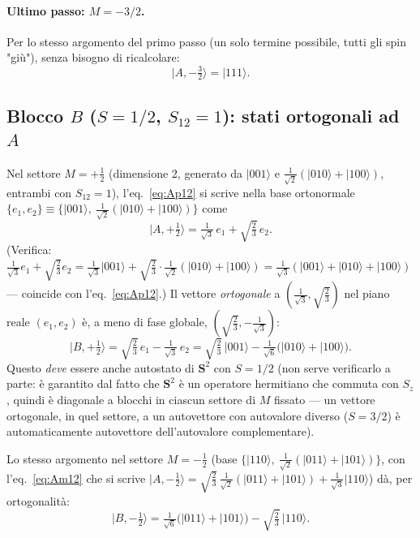 \documentclass[11pt,a4paper]{article}
\newcommand{\ket}[1]{\lvert #1\rangle}
\begin{document}
\paragraph{Ultimo passo: $M{=}{-}3/2$.} Per lo stesso argomento del primo
passo (un solo termine possibile, tutti gli spin "giù"), senza bisogno di
ricalcolare:
\begin{equation}
\ket{A,{-}\tfrac32} = \ket{111}.
\end{equation}

\subsection{Blocco $B$ ($S=1/2$, $S_{12}=1$): stati ortogonali ad $A$}

Nel settore $M=+\tfrac12$ (dimensione 2, generato da $\ket{001}$ e
$\tfrac{1}{\sqrt2}(\ket{010}+\ket{100})$, entrambi con $S_{12}=1$), l'eq.~\eqref{eq:Ap12}
si scrive nella base ortonormale $\{e_1,e_2\}\equiv\{\ket{001},\ \tfrac1{\sqrt2}(\ket{010}{+}\ket{100})\}$
come
\begin{equation}
\ket{A,{+}\tfrac12} = \tfrac{1}{\sqrt3}\,e_1 + \sqrt{\tfrac23}\,e_2 .
\end{equation}
(Verifica: $\tfrac1{\sqrt3}e_1+\sqrt{\tfrac23}e_2 = \tfrac1{\sqrt3}\ket{001}+\sqrt{\tfrac23}\cdot\tfrac1{\sqrt2}(\ket{010}{+}\ket{100})=\tfrac1{\sqrt3}(\ket{001}{+}\ket{010}{+}\ket{100})$ — coincide con l'eq.~\eqref{eq:Ap12}.)
Il vettore \emph{ortogonale} a $(\tfrac1{\sqrt3},\sqrt{\tfrac23})$ nel piano
reale $(e_1,e_2)$ è, a meno di fase globale, $(\sqrt{\tfrac23},-\tfrac1{\sqrt3})$:
\begin{equation}
\ket{B,{+}\tfrac12} = \sqrt{\tfrac23}\,e_1 - \tfrac{1}{\sqrt3}\,e_2
= \sqrt{\tfrac23}\,\ket{001} - \tfrac{1}{\sqrt6}\big(\ket{010}+\ket{100}\big).
\label{eq:Bp12}
\end{equation}
Questo \emph{deve} essere anche autostato di $\mathbf S^2$ con $S=1/2$ (non
serve verificarlo a parte: è garantito dal fatto che $\mathbf S^2$ è
un operatore hermitiano che commuta con $S_z$, quindi è diagonale a blocchi
in ciascun settore di $M$ fissato — un vettore ortogonale, in quel settore, a
un autovettore con autovalore diverso ($S{=}3/2$) è automaticamente autovettore
dell'autovalore complementare).

Lo stesso argomento nel settore $M=-\tfrac12$ (base $\{\ket{110},\ \tfrac1{\sqrt2}(\ket{011}{+}\ket{101})\}$,
con l'eq.~\eqref{eq:Am12} che si scrive $\ket{A,-\tfrac12}=\sqrt{\tfrac23}\,\tfrac1{\sqrt2}(\ket{011}{+}\ket{101})+\tfrac1{\sqrt3}\ket{110}$) dà, per ortogonalità:
\begin{equation}
\ket{B,{-}\tfrac12} = \tfrac{1}{\sqrt6}\big(\ket{011}+\ket{101}\big) - \sqrt{\tfrac23}\,\ket{110}.
\label{eq:Bm12}
\end{equation}
\end{document}
